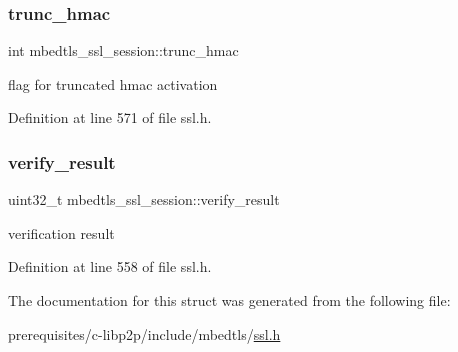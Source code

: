 \mbox{\label{structmbedtls__ssl__session_ad782325576a5b4c06bf55e2b9f2c7bcc}} 
\subsubsection{\texorpdfstring{trunc\+\_\+hmac}{trunc\_hmac}}
{\footnotesize\ttfamily int mbedtls\+\_\+ssl\+\_\+session\+::trunc\+\_\+hmac}

flag for truncated hmac activation 

Definition at line 571 of file ssl.\+h.

\mbox{\label{structmbedtls__ssl__session_a7767cf999b47eaa545fb6a86b3447a20}} 
\subsubsection{\texorpdfstring{verify\+\_\+result}{verify\_result}}
{\footnotesize\ttfamily uint32\+\_\+t mbedtls\+\_\+ssl\+\_\+session\+::verify\+\_\+result}

verification result 

Definition at line 558 of file ssl.\+h.



The documentation for this struct was generated from the following file\+:\begin{DoxyCompactItemize}
\item 
prerequisites/c-\/libp2p/include/mbedtls/\mbox{\hyperlink{ssl_8h}{ssl.\+h}}\end{DoxyCompactItemize}
